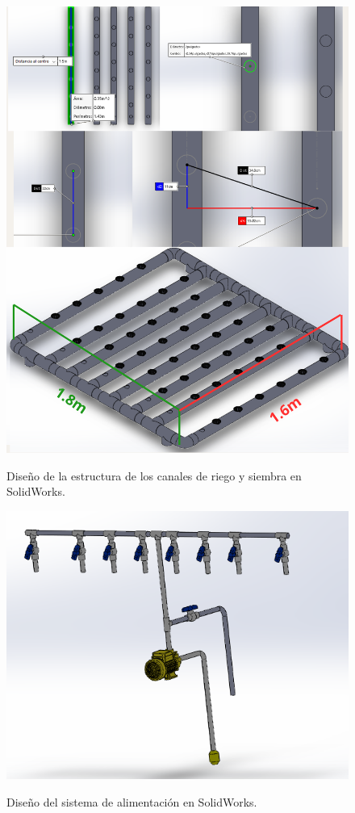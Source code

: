  \begin{figure}[H]
\centering
         \includegraphics[scale=0.8]{imgs/1.8m.png} \\
    \caption{Diseño de la estructura de los canales de riego y siembra en SolidWorks. }\label{sistema1}
\end{figure}
\newpage
 \begin{figure}[H]
\centering
         \includegraphics[scale=0.8]{imgs/alimentacion.PNG} \\
    \caption{Diseño del sistema de alimentación en SolidWorks. }\label{sistema2}
\end{figure}
